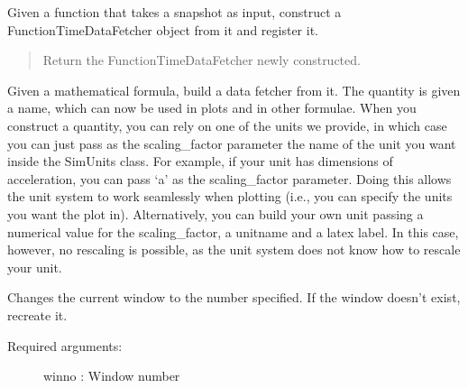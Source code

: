 \documentclass[letterpaper,10pt,english]{sphinxmanual}
\begin{document}
\begin{fulllineitems}
\label{index:facade.CreateTimeData}
Given a function that takes a snapshot as input, construct a
FunctionTimeDataFetcher object from it and register it.
\begin{quote}

Return the FunctionTimeDataFetcher newly constructed.
\end{quote}

\end{fulllineitems}


\begin{fulllineitems}
\label{index:facade.CreateUserQuantity}
Given a mathematical formula, build a data fetcher from it.
The quantity is given a name, which can now be used in plots and in other
formulae.  When you construct a quantity, you can rely on one of the units we
provide, in which case you can just pass as the scaling\_factor parameter the
name of the unit you want inside the SimUnits class. For example, if your unit
has dimensions of acceleration, you can pass `a' as the scaling\_factor
parameter. Doing this allows the unit system to work seamlessly when plotting
(i.e., you can specify the units you want the plot in).  Alternatively, you can
build your own unit passing a numerical value for the scaling\_factor,
a unitname and a latex label.  In this case, however, no rescaling is possible,
as the unit system does not know how to rescale your unit.

\end{fulllineitems}


\begin{fulllineitems}
\label{index:facade.window}
Changes the current window to the number specified. If the window
doesn't exist, recreate it.
\begin{description}
\item[{Required arguments:}] \leavevmode
winno      : Window number

\end{description}

\end{fulllineitems}
\end{document}
